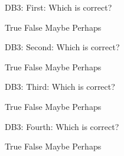 %
%


\begin{rtVW}
\begin{problem}[5]
DB3: First: Which is correct?
\begin{answers}{4}
\bChoices[nCols=2,random]
     True\eAns
     False\eAns
     Maybe\eAns
     Perhaps\eAns
\eChoices
\end{answers}
\end{problem}
\end{rtVW}

\begin{rtVW}
\begin{problem}[5]
DB3: Second: Which is correct?
\begin{answers}{4}
\bChoices[nCols=2,random]
     True\eAns
     False\eAns
     Maybe\eAns
     Perhaps\eAns
\eChoices
\end{answers}
\end{problem}
\end{rtVW}

\begin{rtVW}
\begin{problem}[5]
DB3: Third: Which is correct?
\begin{answers}{4}
\bChoices[nCols=2,random]
     True\eAns
     False\eAns
     Maybe\eAns
     Perhaps\eAns
\eChoices
\end{answers}
\end{problem}
\end{rtVW}

\begin{rtVW}
\begin{problem}[5]
DB3: Fourth: Which is correct?
\begin{answers}{4}
\bChoices[nCols=2,random]
     True\eAns
     False\eAns
     Maybe\eAns
     Perhaps\eAns
\eChoices
\end{answers}
\end{problem}
\end{rtVW}

\eRTVToks

\endinput